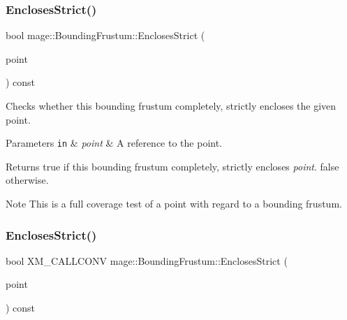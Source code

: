 \subsubsection{\texorpdfstring{Encloses\+Strict()}{EnclosesStrict()}\hspace{0.1cm}{\footnotesize\ttfamily [1/4]}}
{\footnotesize\ttfamily bool mage\+::\+Bounding\+Frustum\+::\+Encloses\+Strict (\begin{DoxyParamCaption}\item[{const \mbox{\hyperlink{structmage_1_1_point3}{Point3}} \&}]{point }\end{DoxyParamCaption}) const\hspace{0.3cm}{\ttfamily [noexcept]}}

Checks whether this bounding frustum completely, strictly encloses the given point.


\begin{DoxyParams}[1]{Parameters}
\mbox{\tt in}  & {\em point} & A reference to the point. \\
\hline
\end{DoxyParams}
\begin{DoxyReturn}{Returns}
{\ttfamily true} if this bounding frustum completely, strictly encloses {\itshape point}. {\ttfamily false} otherwise. 
\end{DoxyReturn}
\begin{DoxyNote}{Note}
This is a full coverage test of a point with regard to a bounding frustum. 
\end{DoxyNote}
\mbox{\label{classmage_1_1_bounding_frustum_a7cd247470d192464f006b2b76ad3c336}} 
\subsubsection{\texorpdfstring{Encloses\+Strict()}{EnclosesStrict()}\hspace{0.1cm}{\footnotesize\ttfamily [2/4]}}
{\footnotesize\ttfamily bool X\+M\+\_\+\+C\+A\+L\+L\+C\+O\+NV mage\+::\+Bounding\+Frustum\+::\+Encloses\+Strict (\begin{DoxyParamCaption}\item[{F\+X\+M\+V\+E\+C\+T\+OR}]{point }\end{DoxyParamCaption}) const\hspace{0.3cm}{\ttfamily [noexcept]}}


